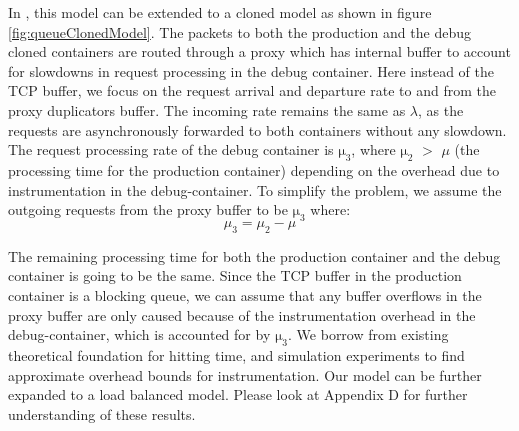 In \parikshan, this model can be extended to a cloned model as shown in figure \ref{fig:queueClonedModel}.
The packets to both the production and the debug cloned containers are routed through a proxy which has internal buffer to account for slowdowns in request processing in the debug container. 
Here instead of the TCP buffer, we focus on the request arrival and departure rate to and from the proxy duplicators buffer.
The incoming rate remains the same as $\lambda$, as the requests are asynchronously forwarded to both containers without any slowdown. 
The request processing rate of the debug container is $\mathrm{\mu_{3}}$, where $\mathrm{\mu_{2}}$ $>$ $\mu$ (the processing time for the production container) depending on the overhead due to instrumentation in the debug-container.
To simplify the problem, we assume the outgoing requests from the proxy buffer to be $\mathrm{\mu_{3}}$ where:\\

\begin{equation}
\mu_{3} = \mu_{2} - \mu
\end{equation}

The remaining processing time for both the production container and the debug container is going to be the same. 
Since the TCP buffer in the production container is a blocking queue, we can assume that any buffer overflows in the proxy buffer are only caused because of the instrumentation overhead in the debug-container, which is accounted for by $\mathrm{\mu_{3}}$. 
We borrow from existing theoretical foundation for hitting time, and simulation experiments to find approximate overhead bounds for instrumentation. 
Our model can be further expanded to a load balanced model. Please look at Appendix D for further understanding of these results.

